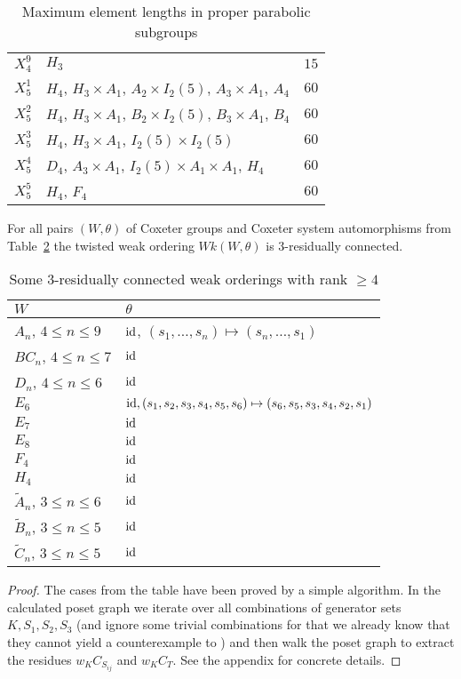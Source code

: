 \begin{table}[ht]
\begin{tabular}{l|p{7cm}|l}
		$X_4^9$ & $H_3$ & $15$ \\
		$X_5^1$ & $H_4$, $H_3 \times A_1$, $A_2 \times I_2(5)$, $A_3 \times A_1$, $A_4$ & $60$ \\
		$X_5^2$ & $H_4$, $H_3 \times A_1$, $B_2 \times I_2(5)$, $B_3 \times A_1$, $B_4$ & $60$ \\
		$X_5^3$ & $H_4$, $H_3 \times A_1$, $I_2(5) \times I_2(5)$ & $60$ \\
		$X_5^4$ & $D_4$, $A_3 \times A_1$, $I_2(5) \times A_1 \times A_1$, $H_4$ & $60$ \\
		$X_5^5$ & $H_4$, $F_4$ & $60$ \\
	\end{tabular}
	\caption{Maximum element lengths in proper parabolic subgroups}
	\label{tab:parabolic-max-length}	
\end{table}

\begin{theo}
	For all pairs $(W,\theta)$ of Coxeter groups and Coxeter system automorphisms from Table~\ref{tab:rc3-wks} the twisted weak ordering $Wk(W,\theta)$ is 3-residually connected.

	\begin{table}[ht]
		\centering
		\begin{tabular}{ll}
			$W$ & $\theta$ \\
			\hline
			$A_n$, $4 \leq n \leq 9$ & $\operatorname{id}$, $(s_1, \ldots, s_n) \mapsto (s_n, \ldots, s_1)$ \\
			$BC_{n}$, $4 \leq n \leq 7$ & $\operatorname{id}$ \\
			$D_{n}$, $4 \leq n \leq 6$ & $\operatorname{id}$ \\
			$E_6$ & $\operatorname{id}, (s_1,s_2,s_3,s_4,s_5,s_6) \mapsto (s_6,s_5,s_3,s_4,s_2,s_1)$ \\
			$E_7$ & $\operatorname{id}$ \\
			$E_8$ & $\operatorname{id}$ \\
			$F_4$ & $\operatorname{id}$ \\
			$H_4$ & $\operatorname{id}$ \\
			$\tilde A_{n}$, $3 \leq n \leq 6$ & $\operatorname{id}$ \\
			$\tilde B_{n}$, $3 \leq n \leq 5$ & $\operatorname{id}$ \\
			$\tilde C_{n}$, $3 \leq n \leq 5$ & $\operatorname{id}$ \\
		\end{tabular}
		\caption{Some 3-residually connected weak orderings with rank $\geq 4$}
		\label{tab:rc3-wks}	
	\end{table}

	\begin{proof}
		The cases from the table have been proved by a simple algorithm. In the calculated poset graph we iterate over all combinations of generator sets $K,S_1,S_2,S_3$ (and ignore some trivial combinations for that we already know that they cannot yield a counterexample to ) and then walk the poset graph to extract the residues $w_K C_{S_{ij}}$ and $w_K C_T$. See the appendix for concrete details.
	\end{proof}
\end{theo}

